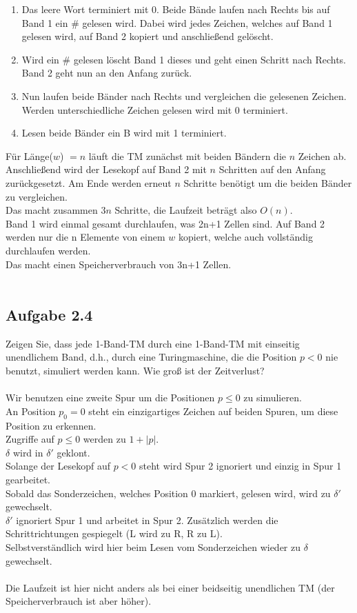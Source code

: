 \begin{enumerate}
	\item Das leere Wort terminiert mit 0. Beide Bände laufen nach Rechts bis auf Band 1 ein $\#$ gelesen wird. Dabei wird jedes Zeichen, welches auf Band 1 gelesen wird, auf Band 2 kopiert und anschließend gelöscht.
	\item Wird ein $\#$ gelesen löscht Band 1 dieses und geht einen Schritt nach Rechts.
	Band 2 geht nun an den Anfang zurück.
	\item Nun laufen beide Bänder nach Rechts und vergleichen die gelesenen Zeichen. Werden unterschiedliche Zeichen gelesen wird mit 0 terminiert.
	\item Lesen beide Bänder ein B wird mit 1 terminiert.
\end{enumerate}
Für Länge($w$) $=n$ läuft die TM zunächst mit beiden Bändern die $n$ Zeichen ab. Anschließend wird der Lesekopf auf Band 2 mit $n$ Schritten auf den Anfang zurückgesetzt. Am Ende werden erneut $n$ Schritte benötigt um die beiden Bänder zu vergleichen.\\
Das macht zusammen $3n$ Schritte, die Laufzeit beträgt also $O(n)$.\\
Band 1 wird einmal gesamt durchlaufen, was 2n+1 Zellen sind. Auf Band 2 werden nur die n Elemente von einem $w$ kopiert, welche auch vollständig durchlaufen werden.\\
Das macht einen Speicherverbrauch von 3n+1 Zellen.\\\\



\subsection*{Aufgabe 2.4}
Zeigen Sie, dass jede 1-Band-TM durch eine 1-Band-TM mit einseitig unendlichem Band, d.h., durch eine Turingmaschine, die die Position $p < 0$ nie benutzt, simuliert werden kann. Wie groß ist der Zeitverlust?\\\\

Wir benutzen eine zweite Spur um  die Positionen $p \leq 0$ zu simulieren.\\
An Position $p_0 = 0$ steht ein einzigartiges Zeichen auf beiden Spuren, um diese Position zu erkennen.\\
Zugriffe auf $p \leq 0$ werden zu $1+ \left| p \right|$.\\
$\delta$ wird in $\delta'$ geklont.\\
Solange der Lesekopf auf $p < 0$ steht wird Spur 2 ignoriert und einzig in Spur 1 gearbeitet.\\
Sobald das Sonderzeichen, welches Position 0 markiert, gelesen wird, wird zu $\delta'$ gewechselt.\\
$\delta'$ ignoriert Spur 1 und arbeitet in Spur 2. Zusätzlich werden die Schrittrichtungen gespiegelt (L wird zu R, R zu L).\\
Selbstverständlich wird hier beim Lesen vom Sonderzeichen wieder zu $\delta$ gewechselt.\\\\

Die Laufzeit ist hier nicht anders als bei einer beidseitig unendlichen TM (der Speicherverbrauch ist aber höher).